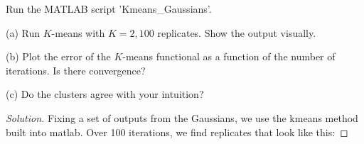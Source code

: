\documentclass[10pt]{article}
\newenvironment{problem}[2][]{\begin{trivlist}
\item[\hskip \labelsep {\bfseries #1}\hskip \labelsep {\bfseries #2.}]}{\end{trivlist}}
\begin{document}
\begin{problem}{Question 5}
 
Run the MATLAB script 'Kmeans\_Gaussians'.

(a) Run $K$-means with $K=2, 100$ replicates. Show the output visually.

(b) Plot the error of the $K$-means functional as a function of the number of iterations. Is there convergence?

(c) Do the clusters agree with your intuition?

\end{problem}

\begin{proof}[Solution]

Fixing a set of outputs from the Gaussians, we use the kmeans method built into matlab. Over 100 iterations, we find replicates that look like this:



\end{proof}
\end{document}
